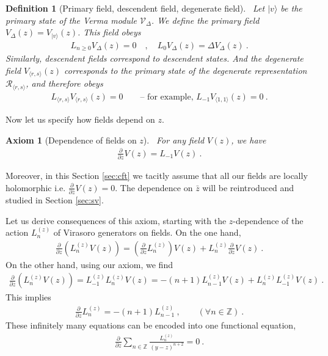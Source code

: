 \documentclass[12pt, a4paper]{article}
\theoremstyle{break}
\newtheorem{hyp}[exo]{Axiom}
\newtheorem{defn}[exo]{Definition}
\begin{document}
\begin{defn}[Primary field, descendent field, degenerate field]
~\label{def:pfdf}
Let $|v\rangle$ be the primary state of the Verma module $\mathcal V_\Delta$.
We define the primary field $V_\Delta(z)=V_{|v\rangle}(z)$. This field obeys
\begin{align}
 L_{n\geq 0} V_\Delta(z) = 0 \quad , \quad L_0 V_\Delta(z) = \Delta V_\Delta(z)\ .
\end{align}
Similarly, descendent fields correspond to descendent states. And the degenerate field $V_{\langle r,s\rangle}(z)$ corresponds to the primary state of the degenerate representation $\mathcal{R}_{\langle r,s\rangle}$, and therefore obeys 
\begin{align}
 L_{\langle r, s\rangle} V_{\langle r,s\rangle}(z) = 0\qquad \text{-- for example, \ } L_{-1}V_{\langle 1,1\rangle}(z) = 0\ .
\end{align}
\end{defn}

Now let us specify how fields depend on $z$. 

\begin{hyp}[Dependence of fields on $z$]
 ~\label{hyp:geom}
 For any field $V(z)$, we have 
 \begin{align}
  \frac{\partial}{\partial z} V(z) = L_{-1} V(z)  \ .
  \label{pvlv}
 \end{align}
\end{hyp}
Moreover, in this Section \ref{sec:cft} we tacitly assume that all our fields are locally holomorphic i.e. $\frac{\partial}{\partial \bar z} V(z) = 0$. The dependence on $\bar z$ will be reintroduced and studied in Section \ref{sec:sv}.

Let us derive consequences of this axiom, starting with the $z$-dependence of the action $L_n^{(z)}$ of Virasoro generators on fields. On the one hand,
\begin{align}
 \frac{\partial}{\partial z} \left( L_n^{(z)} V(z) \right) = \left(\frac{\partial}{\partial z} L_n^{(z)}\right) V(z) + L_n^{(z)} \frac{\partial}{\partial z} V(z)\ .
\end{align}
On the other hand, using our axiom, we find 
\begin{align}
 \frac{\partial}{\partial z} \left( L_n^{(z)} V(z) \right) = L_{-1}^{(z)} L_n^{(z)} V(z) = -(n+1)L_{n-1}^{(z)} V(z) + L_n^{(z)} L_{-1}^{(z)} V(z)\ .
\end{align}
This implies 
\begin{align}
 \frac{\partial}{\partial z} L_n^{(z)} = -(n+1)L_{n-1}^{(z)}\ ,\qquad (\forall n\in\mathbb{Z})\ .
\end{align}
These infinitely many equations can be encoded into one functional equation,
\begin{align}
 \frac{\partial}{\partial z} \sum_{n\in\mathbb{Z}} \frac{L_n^{(z)}}{(y-z)^{n+2}} = 0\ .
\end{align}
\end{document}
